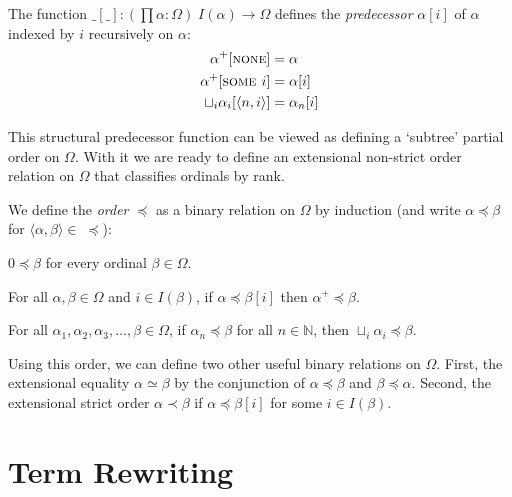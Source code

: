 \begin{definition}%
The function $\_[\_] : (\prod \alpha : \Omega) \; I(\alpha) \rightarrow
\Omega$ defines the \emph{predecessor} $\alpha[i]$ of $\alpha$ indexed by $i$
recursively on $\alpha$:
\begin{align*}
  \alpha^+[\textsc{none}]                 &= \alpha \\
  \alpha^+[\textsc{some $i$}]             &= \alpha[i] \\
  \sqcup_i \alpha_i[\langle n, i \rangle] &= \alpha_n[i]
\end{align*}
\end{definition}


This structural predecessor function can be viewed as defining a `subtree'
partial order on $\Omega$. With it we are ready to define an extensional
non-strict order relation on $\Omega$ that classifies ordinals by rank.

\begin{definition}\label{def:order}%
We define the \emph{order} $\preceq$ as a binary relation on $\Omega$ by
induction (and write $\alpha \preceq \beta$ for $\langle \alpha, \beta \rangle
\in \; \preceq$):
\begin{compactenum}
  \item
    $0 \preceq \beta$ for every ordinal $\beta \in \Omega$.
  \item\label{def:order:succ}
    For all $\alpha, \beta \in \Omega$ and $i \in I(\beta)$, if $\alpha
    \preceq \beta[i]$ then $\alpha^+ \preceq \beta$.
  \item
    For all $\alpha_1, \alpha_2, \alpha_3, \ldots, \beta \in \Omega$, if
    $\alpha_n \preceq \beta$ for all $n \in \mathbb{N}$, then $\sqcup_i
    \alpha_i \preceq \beta$.
\end{compactenum}
\end{definition}

Using this order, we can define two other useful binary relations on
$\Omega$. First, the extensional equality $\alpha \simeq \beta$ by the
conjunction of $\alpha \preceq \beta$ and $\beta \preceq \alpha$. Second, the
extensional strict order $\alpha \prec \beta$ if $\alpha \preceq \beta[i]$ for
some $i \in I(\beta)$.


\section{Term Rewriting}\label{sec:rewriting}

